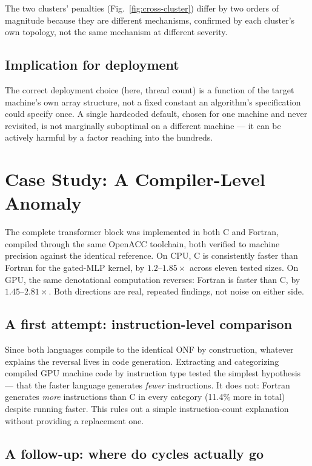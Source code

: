 \documentclass[sigconf,review,anonymous]{acmart}
\begin{document}
The two clusters' penalties (Fig.~\ref{fig:cross-cluster}) differ by
two orders of magnitude because they are different mechanisms,
confirmed by each cluster's own topology, not the same mechanism at
different severity.

\subsection{Implication for deployment}

The correct deployment choice (here, thread count) is a function of
the target machine's own array structure, not a fixed constant an
algorithm's specification could specify once. A single hardcoded
default, chosen for one machine and never revisited, is not marginally
suboptimal on a different machine --- it can be actively harmful by a
factor reaching into the hundreds.

\section{Case Study: A Compiler-Level Anomaly}
\label{sec:language}

The complete transformer block was implemented in both C and Fortran,
compiled through the same OpenACC toolchain, both verified to machine
precision against the identical reference. On CPU, C is consistently
faster than Fortran for the gated-MLP kernel, by $1.2$--$1.85\times$
across eleven tested sizes. On GPU, the same denotational computation
reverses: Fortran is faster than C, by $1.45$--$2.81\times$. Both
directions are real, repeated findings, not noise on either side.

\subsection{A first attempt: instruction-level comparison}

Since both languages compile to the identical ONF by construction,
whatever explains the reversal lives in code generation. Extracting
and categorizing compiled GPU machine code by instruction type tested
the simplest hypothesis --- that the faster language generates
\emph{fewer} instructions. It does not: Fortran generates \emph{more}
instructions than C in every category (11.4\% more in total) despite
running faster. This rules out a simple instruction-count explanation
without providing a replacement one.

\subsection{A follow-up: where do cycles actually go}
\end{document}
